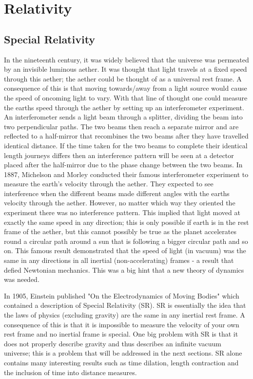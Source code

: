 \section{Relativity}

\subsection{Special Relativity}

In the nineteenth century, it was widely believed that the universe was permeated by an invisible luminous aether. It was thought that light travels at a fixed speed through this aether; the aether could be thought of as a universal rest frame. A consequence of this is that moving towards/away from a light source would cause the speed of oncoming light to vary. With that line of thought one could measure the earths speed through the aether by setting up an interferometer experiment. An interferometer sends a light beam through a splitter, dividing the beam into two perpendicular paths. The two beams then reach a separate mirror and are reflected to a half-mirror that recombines the two beams after they have travelled identical distance. If the time taken for the two beams to complete their identical length journeys differs then an interference pattern will be seen at a detector placed after the half-mirror due to the phase change between the two beams. In 1887, Michelson and Morley conducted their famous interferometer experiment to measure the earth's velocity through the aether. They expected to see interference when the different beams made different angles with the earths velocity through the aether. However, no matter which way they oriented the experiment there was no interference pattern. This implied that light moved at exactly the same speed in any direction; this is only possible if earth is in the rest frame of the aether, but this cannot possibly be true as the planet accelerates round a circular path around a sun that is following a bigger circular path and so on. This famous result demonstrated that the speed of light (in vacuum) was the same in any directions in all inertial (non-accelerating) frames - a result that defied Newtonian mechanics. This was a big hint that a new theory of dynamics was needed. 

In 1905, Einstein published "On the Electrodynamics of Moving Bodies" \cite{einstein1905electrodynamics} which contained a description of Special Relativity (SR). SR is essentially the idea that the laws of physics (excluding gravity) are the same in any inertial rest frame. A consequence of this is that it is impossible to measure the velocity of your own rest frame and no inertial frame is special. One big problem with SR is that it does not properly describe gravity and thus describes an infinite vacuum universe; this is a problem that will be addressed in the next sections. SR alone contains many interesting results such as time dilation, length contraction and the inclusion of time into distance measures. 

